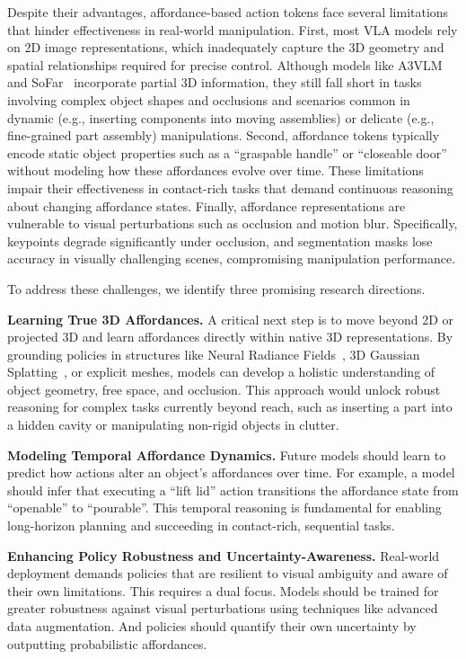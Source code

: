 \documentclass[10pt, a4paper, logo, copyright]{googledeepmind} %
\begin{document}
Despite their advantages, affordance-based action tokens face several limitations that hinder effectiveness in real-world manipulation. First, most VLA models rely on 2D image representations, which inadequately capture the 3D geometry and spatial relationships required for precise control. Although models like A3VLM~\cite{huanga3vlm} and SoFar~\cite{qi2025sofar} incorporate partial 3D information, they still fall short in tasks involving complex object shapes and occlusions and scenarios common in dynamic (e.g., inserting components into moving assemblies) or delicate (e.g., fine-grained part assembly) manipulations. Second, affordance tokens typically encode static object properties such as a ``graspable handle'' or ``closeable door'' without modeling how these affordances evolve over time. These limitations impair their effectiveness in contact-rich tasks that demand continuous reasoning about changing affordance states. Finally, affordance representations are vulnerable to visual perturbations such as occlusion and motion blur. Specifically, keypoints degrade significantly under occlusion, and segmentation masks lose accuracy in visually challenging scenes, compromising manipulation performance.

To address these challenges, we identify three promising research directions.

\textbf{Learning True 3D Affordances.} A critical next step is to move beyond 2D or projected 3D and learn affordances directly within native 3D representations. By grounding policies in structures like Neural Radiance Fields~\cite{978-3-030-58452-8_24}, 3D Gaussian Splatting~\cite{10.1145/3592433}, or explicit meshes, models can develop a holistic understanding of object geometry, free space, and occlusion. This approach would unlock robust reasoning for complex tasks currently beyond reach, such as inserting a part into a hidden cavity or manipulating non-rigid objects in clutter.
    
\textbf{Modeling Temporal Affordance Dynamics.} Future models should learn to predict how actions alter an object's affordances over time. For example, a model should infer that executing a ``lift lid'' action transitions the affordance state from ``openable'' to ``pourable''. This temporal reasoning is fundamental for enabling long-horizon planning and succeeding in contact-rich, sequential tasks.

\textbf{Enhancing Policy Robustness and Uncertainty-Awareness.} Real-world deployment demands policies that are resilient to visual ambiguity and aware of their own limitations. This requires a dual focus. Models should be trained for greater robustness against visual perturbations using techniques like advanced data augmentation. And policies should quantify their own uncertainty by outputting probabilistic affordances. 
\end{document}
